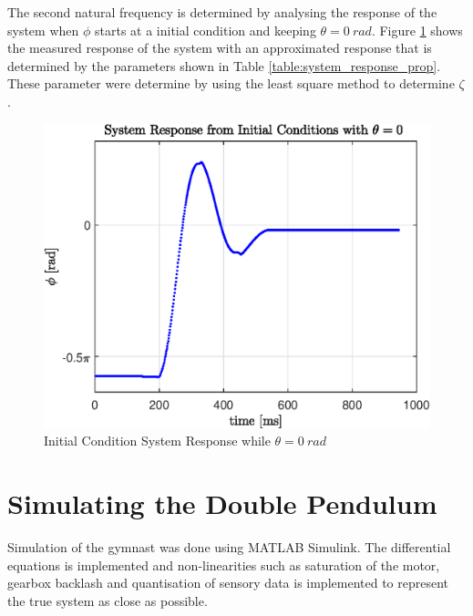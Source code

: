\documentclass[a4paper,12pt]{article}
\begin{document}
	
	The second natural frequency is determined by analysing the response of the system when $\phi$ starts at a initial condition and keeping $\theta = \SI{0}{rad}$. Figure \ref{fig:q2_response} shows the measured response of the system with an approximated response that is determined by the parameters shown in Table \ref{table:system_response_prop}. These parameter were determine by using the least square method to determine $\zeta$.
	
	\begin{figure}[h]
		\centering
		\includegraphics[scale=0.5]{q2_initial_response.eps}
		\caption{Initial Condition System Response while $ \theta = \SI{0}{rad} $ }
		\label{fig:q2_response}
	\end{figure}

	
	
	
	
	\section{Simulating the Double Pendulum}
	
	Simulation of the gymnast was done using MATLAB Simulink. The differential equations is implemented and non-linearities such as saturation of the motor, gearbox backlash and quantisation of sensory data is implemented to represent the true system as close as possible.
	
\end{document}
